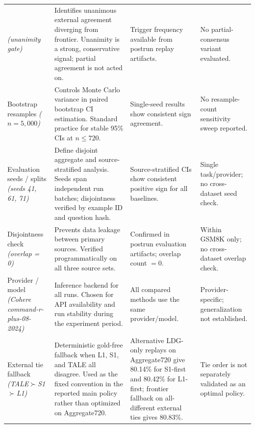\begin{table}[t]
{\begin{tabular}{@{}>{\raggedright\arraybackslash}p{}>{\raggedright\arraybackslash}p{}>{\raggedright\arraybackslash}p{}>{\raggedright\arraybackslash}p{}@{}}
  \textit{(unanimity gate)} &
  Identifies unanimous external agreement diverging from frontier.
  Unanimity is a strong, conservative signal; partial agreement is not acted on. &
  Trigger frequency available from postrun replay artifacts. &
  No partial-consensus variant evaluated. \\
\addlinespace
Bootstrap resamples \newline \textit{($n = 5{,}000$)} &
  Controls Monte Carlo variance in paired bootstrap CI estimation.
  Standard practice for stable 95\% CIs at $n \leq 720$. &
  Single-seed results show consistent sign agreement. &
  No resample-count sensitivity sweep reported. \\
\addlinespace
Evaluation seeds / splits \newline \textit{(seeds 41, 61, 71)} &
  Define disjoint aggregate and source-stratified analysis.
  Seeds span independent run batches; disjointness verified by example ID and question hash. &
  Source-stratified CIs show consistent positive sign for all baselines. &
  Single task/provider; no cross-dataset seed check. \\
\addlinespace
Disjointness check \newline \textit{(overlap = 0)} &
  Prevents data leakage between primary sources.
  Verified programmatically on all three source sets. &
  Confirmed in postrun evaluation artifacts; overlap count $= 0$. &
  Within GSM8K only; no cross-dataset overlap check. \\
\addlinespace
Provider / model \newline \textit{(Cohere command-r-plus-08-2024)} &
  Inference backend for all runs.
  Chosen for API availability and run stability during the experiment period. &
  All compared methods use the same provider/model. &
  Provider-specific; generalization not established. \\
\addlinespace
External tie fallback \newline \textit{(TALE$\succ$S1$\succ$L1)} &
  Deterministic gold-free fallback when L1, S1, and TALE all disagree.
  Used as the fixed convention in the reported main policy rather than optimized on Aggregate720. &
  Alternative LDG-only replays on Aggregate720 give 80.14\% for S1-first and 80.42\% for L1-first; frontier fallback on all-different external ties gives 80.83\%. &
  Tie order is not separately validated as an optimal policy. \\
\bottomrule
\end{tabular}}
\end{table}
